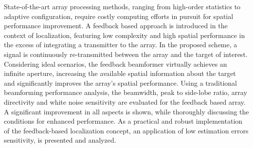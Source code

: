 State-of-the-art array processing methods, ranging from high-order statistics to adaptive configuration, require costly computing efforts in pursuit for spatial performance improvement.
A feedback based approach is introduced in the context of localization, featuring low complexity and high spatial performance in the excess of integrating a transmitter to the array.  
In the proposed scheme, a signal is continuously re-transmitted between the array and the target of interest.
Considering ideal scenarios, the feedback beamformer virtually achieves an infinite aperture, increasing the available spatial information about the target and significantly improves the array's spatial performance.
Using a traditional beamforming performance analysis, the beamwidth, peak to side-lobe ratio, array directivity and white noise sensitivity are evaluated for the feedback based array.
A significant improvement in all aspects is shown, while thoroughly discussing the conditions for enhanced performance.
As a practical and robust implementation of the feedback-based localization concept, an application of low estimation errors sensitivity, 
is presented and analyzed.